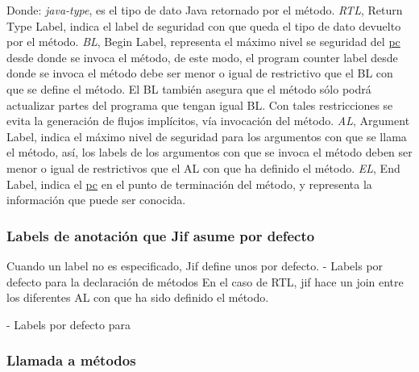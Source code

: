 Donde: \emph{java-type}, es el tipo de dato Java retornado por el
método.\newline 
\emph{RTL}, Return Type Label, indica el label de seguridad con que
queda el tipo de dato devuelto por el método.\newline 
\emph{BL}, Begin Label, representa el máximo nivel se seguridad del
\underline{pc} desde donde se invoca el método, de este modo, el program
counter label desde donde se invoca el método debe ser menor o igual de restrictivo que el BL con
que se define el método. El BL también asegura que el método sólo podrá
actualizar partes del programa que tengan igual BL. Con tales restricciones
se evita la generación de flujos implícitos, vía invocación del método.
\newline
\emph{AL}, Argument Label, indica el máximo nivel de seguridad para los
argumentos con que se llama el método, así, los labels de los argumentos con que se
invoca el método deben ser menor o igual de restrictivos que el AL con que ha
definido el método.\newline 
\emph{EL}, End Label, indica el \underline{pc} en el punto de terminación del
método, y representa la información que puede ser conocida.

\subsubsection{Labels de anotación que Jif asume por defecto}
Cuando un label no es especificado, Jif define unos por defecto. 
- Labels por defecto para la declaración de métodos\newline
En el caso de
RTL, jif hace un join entre los diferentes AL con que ha sido definido el
método.

- Labels por defecto para \newline

\subsubsection{Llamada a métodos}